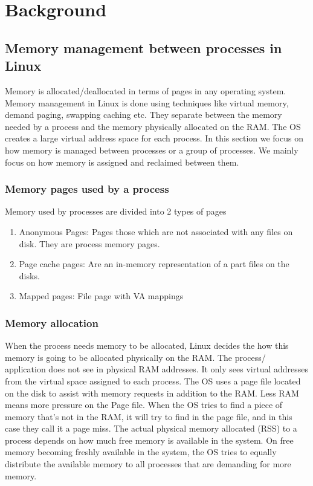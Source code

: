\chapter{Background}

  
  \section{Memory management between processes in Linux}
  
    Memory is allocated/deallocated in terms of pages in any operating system. Memory management in Linux is done using techniques like 
virtual memory, demand paging, swapping caching etc. They separate between the memory needed by a process and the memory physically 
allocated on the RAM. The OS creates a large virtual address space for each process. In this section we focus on how memory is managed 
between processes or a group of processes. We mainly focus on how memory is assigned and reclaimed between them.  
  
    \subsection{Memory pages used by a process}
      Memory used by processes are divided into 2 types of pages	
      \begin{enumerate}	
	\item Anonymous Pages: Pages those which are not associated with any files on disk. They are process memory pages.
	\item Page cache pages: Are an in-memory representation of a part files on the disks.	
	\item Mapped pages: File page with VA mappings
      \end{enumerate}
  
    \subsection{Memory allocation}
      When the process needs memory to be allocated, Linux decides the how this memory is going to be allocated physically on the RAM. The 
process/ application does not see in physical RAM addresses. It only sees virtual addresses from the virtual space assigned to each process.
The OS uses a page file located on the disk to assist with memory requests in addition to the RAM. Less RAM means more pressure on the Page 
file. When the OS tries to find a piece of memory that's not in the RAM, it will try to find in the page file, and in this case they call it 
a page miss. The actual physical memory allocated (RSS) to a process depends on how much free memory is available in the system. On free 
memory becoming freshly available in the system, the OS tries to equally distribute the available memory to all processes that are 
demanding for more memory.

